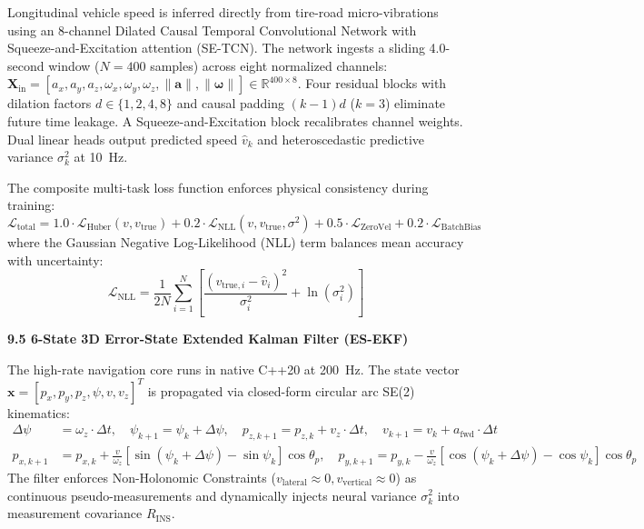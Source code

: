 \documentclass[11pt,a4paper]{article}
\begin{document}
Longitudinal vehicle speed is inferred directly from tire-road micro-vibrations using an 8-channel Dilated Causal Temporal Convolutional Network with Squeeze-and-Excitation attention (SE-TCN). The network ingests a sliding 4.0-second window ($N = 400$ samples) across eight normalized channels: $\mathbf{X}_{\text{in}} = [a_x, a_y, a_z, \omega_x, \omega_y, \omega_z, \|\mathbf{a}\|, \|\boldsymbol{\omega}\|] \in \mathbb{R}^{400 \times 8}$. Four residual blocks with dilation factors $d \in \{1, 2, 4, 8\}$ and causal padding $(k-1)d$ ($k=3$) eliminate future time leakage. A Squeeze-and-Excitation block recalibrates channel weights. Dual linear heads output predicted speed $\hat{v}_k$ and heteroscedastic predictive variance $\sigma_k^2$ at 10~Hz.

The composite multi-task loss function enforces physical consistency during training:
\begin{equation}
\mathcal{L}_{\text{total}} = 1.0 \cdot \mathcal{L}_{\text{Huber}}(v, v_{\text{true}}) + 0.2 \cdot \mathcal{L}_{\text{NLL}}(v, v_{\text{true}}, \sigma^2) + 0.5 \cdot \mathcal{L}_{\text{ZeroVel}} + 0.2 \cdot \mathcal{L}_{\text{BatchBias}}
\end{equation}
where the Gaussian Negative Log-Likelihood (NLL) term balances mean accuracy with uncertainty:
\begin{equation}
\mathcal{L}_{\text{NLL}} = \frac{1}{2N} \sum_{i=1}^N \left[ \frac{(v_{\text{true},i} - \hat{v}_i)^2}{\sigma_i^2} + \ln(\sigma_i^2) \right]
\end{equation}

\textbf{9.5 6-State 3D Error-State Extended Kalman Filter (ES-EKF)}

The high-rate navigation core runs in native C++20 at 200~Hz. The state vector $\mathbf{x} = [p_x, p_y, p_z, \psi, v, v_z]^T$ is propagated via closed-form circular arc SE(2) kinematics:
\begin{align}
\Delta \psi &= \omega_z \cdot \Delta t, \quad \psi_{k+1} = \psi_k + \Delta \psi, \quad p_{z, k+1} = p_{z, k} + v_z \cdot \Delta t, \quad v_{k+1} = v_k + a_{\text{fwd}} \cdot \Delta t \\
p_{x, k+1} &= p_{x, k} + \frac{v}{\omega_z} \left[ \sin(\psi_k + \Delta \psi) - \sin\psi_k \right] \cos\theta_p, \quad
p_{y, k+1} = p_{y, k} - \frac{v}{\omega_z} \left[ \cos(\psi_k + \Delta \psi) - \cos\psi_k \right] \cos\theta_p
\end{align}
The filter enforces Non-Holonomic Constraints ($v_{\text{lateral}} \approx 0, v_{\text{vertical}} \approx 0$) as continuous pseudo-measurements and dynamically injects neural variance $\sigma_k^2$ into measurement covariance $R_{\text{INS}}$.
\end{document}
